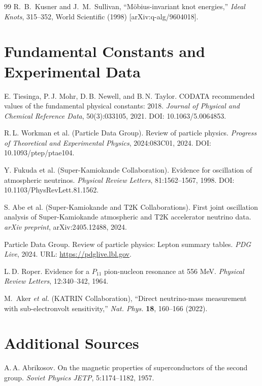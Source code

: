 \documentclass[11pt,a4paper]{article}
\begin{document}
\begin{thebibliography}{99}
 R.~B.~Kusner and J.~M.~Sullivan, ``Möbius-invariant knot energies,''
\textit{Ideal Knots}, 315--352, World Scientific (1998) [arXiv:q-alg/9604018].

\section*{Fundamental Constants and Experimental Data}

E. Tiesinga, P.\,J. Mohr, D.\,B. Newell, and B.\,N. Taylor.
\newblock CODATA recommended values of the fundamental physical constants: 2018.
\newblock \textit{Journal of Physical and Chemical Reference Data}, 50(3):033105, 2021.
\newblock DOI: 10.1063/5.0064853.

R.\,L. Workman et al. (Particle Data Group).
\newblock Review of particle physics.
\newblock \textit{Progress of Theoretical and Experimental Physics}, 2024:083C01, 2024.
\newblock DOI: 10.1093/ptep/ptae104.

Y. Fukuda et al. (Super-Kamiokande Collaboration).
\newblock Evidence for oscillation of atmospheric neutrinos.
\newblock \textit{Physical Review Letters}, 81:1562--1567, 1998.
\newblock DOI: 10.1103/PhysRevLett.81.1562.

S. Abe et al. (Super-Kamiokande and T2K Collaborations).
\newblock First joint oscillation analysis of Super-Kamiokande atmospheric and T2K accelerator neutrino data.
\newblock \textit{arXiv preprint}, arXiv:2405.12488, 2024.

Particle Data Group.
 Review of particle physics: Lepton summary tables.
\newblock \textit{PDG Live}, 2024.
\newblock URL: \url{https://pdglive.lbl.gov}.

L.\,D. Roper.
\newblock Evidence for a $P_{11}$ pion-nucleon resonance at 556 MeV.
\newblock \textit{Physical Review Letters}, 12:340--342, 1964.

M.~Aker \textit{et al.} (KATRIN Collaboration), ``Direct neutrino-mass measurement with sub-electronvolt sensitivity,'' \textit{Nat. Phys.} \textbf{18}, 160--166 (2022).

\section*{Additional Sources}

A.\,A. Abrikosov.
\newblock On the magnetic properties of superconductors of the second group.
\newblock \textit{Soviet Physics JETP}, 5:1174--1182, 1957.


\end{thebibliography}
\end{document}
